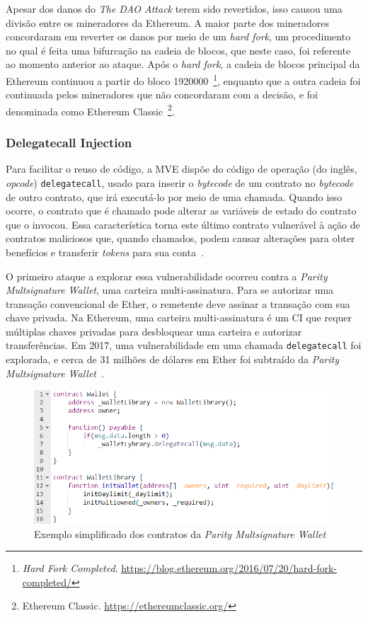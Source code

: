 Apesar dos danos do \textit{The DAO Attack} terem sido revertidos, isso causou uma divisão entre os mineradores da Ethereum. A maior parte dos mineradores concordaram em reverter os danos por meio de um \textit{hard fork}, um procedimento no qual é feita uma bifurcação na cadeia de blocos, que neste caso, foi referente ao momento anterior ao ataque. Após o \textit{hard fork}, a cadeia de blocos principal da Ethereum continuou a partir do bloco 1920000~\footnote{\textit{Hard Fork Completed}. \url{https://blog.ethereum.org/2016/07/20/hard-fork-completed/}}, enquanto que a outra cadeia foi continuada pelos mineradores que não concordaram com a decisão, e foi denominada como Ethereum Classic~\footnote{Ethereum Classic. \url{https://ethereumclassic.org/}}.  

\subsubsection*{\textbf{Delegatecall Injection}}

Para facilitar o reuso de código, a MVE dispõe do código de operação (do inglês, \textit{opcode}) \texttt{delegatecall}, usado para inserir o \textit{bytecode} de um contrato no \textit{bytecode} de outro contrato, que irá executá-lo por meio de uma chamada. Quando isso ocorre, o contrato que é chamado pode alterar as variáveis de estado do contrato que o invocou. Essa característica torna este último contrato vulnerável à ação de contratos maliciosos que, quando chamados, podem causar alterações para obter benefícios e transferir \textit{tokens} para sua conta~\cite{chen2020survey-ethereum-acm}.

O primeiro ataque a explorar essa vulnerabilidade ocorreu contra a \textit{Parity Multsignature Wallet}, uma carteira multi-assinatura. Para se autorizar uma transação convencional de Ether, o remetente deve assinar a transação com sua chave privada. Na Ethereum, uma carteira multi-assinatura é um CI que requer múltiplas chaves privadas para desbloquear uma carteira e autorizar transferências. Em 2017, uma vulnerabilidade em uma chamada \texttt{delegatecall} foi explorada, e cerca de 31 milhões de dólares em Ether foi subtraído da \textit{Parity Multsignature Wallet}~\cite{chen2020survey-ethereum-acm}.

\begin{figure}[!htb]
 \caption{Exemplo simplificado dos contratos da \textit{Parity Multsignature Wallet}}
 \label{fig:parity-wallet}
 \centering
 \includegraphics[scale=0.65]{figuras/parity-wallet.png}
\end{figure}

